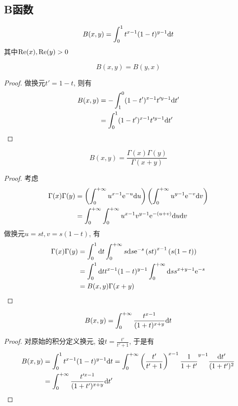 \subsection{B函数}
\begin{definition}
    \begin{equation}
        B(x,y)=\int_0^1 t^{x-1}(1-t)^{y-1}\d t
    \end{equation}
    其中$\rm{Re}(x), \rm{Re}(y)>0$
\end{definition}
\begin{theorem}
    \begin{equation}
        B(x,y)=B(y,x)
    \end{equation}
\end{theorem}
\begin{proof}
    做换元$t'=1-t$, 则有
    \begin{align}
        B(x,y)&=-\int_1^0 (1-t')^{x-1}t'^{y-1}\d t'\\
        &=\int_0^1(1-t')^{x-1}t'^{y-1}\d t'
    \end{align}
\end{proof}
\begin{theorem}\label{B-gamma}
    \begin{equation}
        B(x,y)=\frac{\Gamma(x)\Gamma(y)}{\Gamma(x+y)}
    \end{equation}
\end{theorem}
\begin{proof}
    考虑
    \begin{align}
        \Gamma(x)\Gamma(y)&=\left(\int_0^{+\infty}u^{x-1}\exp{-u}\d u\right)\left(\int_0^{+\infty}u^{y-1}\exp{-v}\d v\right)\\
        &=\int_0^{+\infty}\int_0^{+\infty}u^{x-1}v^{y-1}\exp{-(u+v)}\d u\d v
    \end{align}
    做换元$u=st, v=s(1-t)$, 有
    \begin{align}
        \Gamma(x)\Gamma(y)&=\int_0^1\d t\int_0^{+\infty}s\d s\exp{-s}\left(st\right)^{x-1}\left(s(1-t)\right)\\
        &=\int_0^1\d t t^{x-1}(1-t)^{y-1}\int_0^{+\infty}\d ss^{x+y-1}\exp{-s}\\
        &=B(x,y)\Gamma(x+y)
    \end{align}
\end{proof}
\begin{theorem}\label{beta-equiv}
    \begin{equation}
        B(x,y)=\int_0^{+\infty}\frac{t^{x-1}}{(1+t)^{x+y}}\d t
    \end{equation}
\end{theorem}
\begin{proof}
    对原始的积分定义换元, 设$t=\frac{t'}{t'+1}$, 于是有
    \begin{align}
        B(x,y)&=\int_0^1 t^{x-1}(1-t)^{y-1}\d t=\int_0^{+\infty} \left(\frac{t'}{t'+1}\right)^{x-1}{\frac1{1+t'}}^{y-1}\frac{\d t'}{(1+t')^2}\\
        &=\int_0^{+\infty}\frac{t'^{x-1}}{(1+t')^{x+y}}\d t'
    \end{align}
\end{proof}

